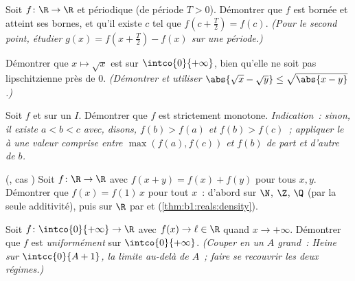 \begin{exercise}[$\star\star$]\label{exo:b1:continuity:8}
Soit $f \colon \R \to \R$  et périodique (de période $T >
0$). Démontrer que $f$ est bornée et atteint ses bornes, et qu'il
existe $c$ tel que $f(c + \frac T2) = f(c)$. \emph{(Pour le second
point, étudier $g(x) = f(x + \frac T2) - f(x)$ sur une période.)}
\end{exercise}

\begin{exercise}[$\star\star$]\label{exo:b1:continuity:9}
Démontrer que $x \mapsto \sqrt x$ est  sur
$\intco{0}{+\infty}$, bien qu'elle ne soit pas lipschitzienne près de
$0$. \emph{(Démontrer et utiliser $\abs{\sqrt x - \sqrt y} \leq
\sqrt{\abs{x - y}}$.)}
\end{exercise}

\begin{exercise}[$\star\star\star$]\label{exo:b1:continuity:10}
Soit $f$  et  sur un  $I$. Démontrer que
$f$ est strictement monotone. \emph{Indication~: sinon, il existe $a
< b < c$ avec, disons, $f(b) > f(a)$ et $f(b) > f(c)$~; appliquer le
 à une valeur comprise entre
$\max(f(a), f(c))$ et $f(b)$ de part et d'autre de $b$.}
\end{exercise}

\begin{exercise}[$\star\star\star$]\label{exo:b1:continuity:11}
(, cas ) Soit $f \colon \R \to
\R$  avec $f(x + y) = f(x) + f(y)$ pour tous $x, y$.
Démontrer que $f(x) = f(1)\,x$ pour tout $x$~: d'abord sur $\N$,
$\Z$, $\Q$ (par la seule additivité), puis sur $\R$ par  et
 (\cref{thm:b1:reals:density}).
\end{exercise}

\begin{exercise}[$\star\star\star$]\label{exo:b1:continuity:12}
Soit $f \colon \intco{0}{+\infty} \to \R$  avec
$f(x) \to \ell \in \R$ quand $x \to +\infty$. Démontrer que $f$ est
\emph{uniformément}  sur $\intco{0}{+\infty}$. \emph{(Couper
en un $A$ grand~: Heine sur $\intcc{0}{A+1}$, la limite au-delà de
$A$~; faire se recouvrir les deux régimes.)}
\end{exercise}

